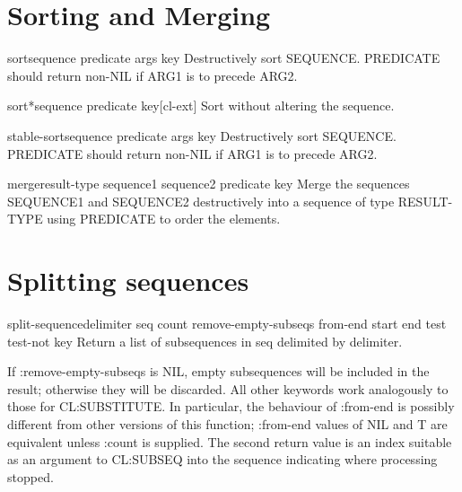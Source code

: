 \documentclass[10pt,english]{book}
\begin{document}
\section{Sorting and Merging}
\label{sec:sorting-merging}

\begin{function}{sort}{sequence predicate \rest args \key key}
  Destructively sort SEQUENCE. PREDICATE should return non-NIL if
  ARG1 is to precede ARG2.
\end{function}

\begin{function}{sort*}{sequence predicate \key key}[cl-ext]
  Sort without altering the sequence.
\end{function}

\begin{function}{stable-sort}{sequence predicate \rest args \key key}
  Destructively sort SEQUENCE. PREDICATE should return non-NIL if
  ARG1 is to precede ARG2.
\end{function}

\begin{function}{merge}{result-type sequence1 sequence2 predicate \key key}
  Merge the sequences SEQUENCE1 and SEQUENCE2 destructively into a
  sequence of type RESULT-TYPE using PREDICATE to order the elements.
\end{function}

\section{Splitting sequences}
\label{sec:splitting-sequences}

\begin{function}{split-sequence}{delimiter seq \key count
    remove-empty-subseqs from-end start end test test-not key}
  Return a list of subsequences in seq delimited by delimiter.

  If :remove-empty-subseqs is NIL, empty subsequences will be included
  in the result; otherwise they will be discarded.  All other keywords
  work analogously to those for CL:SUBSTITUTE.  In particular, the
  behaviour of :from-end is possibly different from other versions of
  this function; :from-end values of NIL and T are equivalent unless
  :count is supplied. The second return value is an index suitable as an
  argument to CL:SUBSEQ into the sequence indicating where processing
  stopped.
\end{function}
\end{document}
